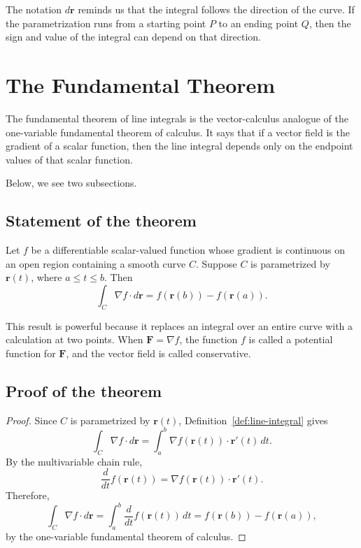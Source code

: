 The notation \(d\mathbf r\) reminds us that the integral follows the direction of the curve. If the parametrization runs from a starting point \(P\) to an ending point \(Q\), then the sign and value of the integral can depend on that direction.

\section{The Fundamental Theorem}
\label{sec:ftli-statement}

The fundamental theorem of line integrals is the vector-calculus analogue of the one-variable fundamental theorem of calculus. It says that if a vector field is the gradient of a scalar function, then the line integral depends only on the endpoint values of that scalar function.

Below, we see two subsections.

\subsection{Statement of the theorem}
\label{sec:ftli-statement-subsection}

\begin{theorem}
\label{thm:ftli}
Let \(f\) be a differentiable scalar-valued function whose gradient is continuous on an open region containing a smooth curve \(C\). Suppose \(C\) is parametrized by \(\mathbf r(t)\), where \(a \leq t \leq b\). Then
\[
\int_C \nabla f \cdot d\mathbf r
= f(\mathbf r(b)) - f(\mathbf r(a)).
\]
\end{theorem}

This result is powerful because it replaces an integral over an entire curve with a calculation at two points. When \(\mathbf F = \nabla f\), the function \(f\) is called a potential function for \(\mathbf F\), and the vector field is called conservative.

\subsection{Proof of the theorem}
\label{sec:ftli-proof-subsection}

\begin{proof}
Since \(C\) is parametrized by \(\mathbf r(t)\), Definition~\ref{def:line-integral} gives
\[
\int_C \nabla f \cdot d\mathbf r
= \int_a^b \nabla f(\mathbf r(t)) \cdot \mathbf r'(t)\,dt.
\]
By the multivariable chain rule,
\[
\frac{d}{dt} f(\mathbf r(t))
= \nabla f(\mathbf r(t)) \cdot \mathbf r'(t).
\]
Therefore,
\[
\int_C \nabla f \cdot d\mathbf r
= \int_a^b \frac{d}{dt} f(\mathbf r(t))\,dt
= f(\mathbf r(b)) - f(\mathbf r(a)),
\]
by the one-variable fundamental theorem of calculus.
\end{proof}

